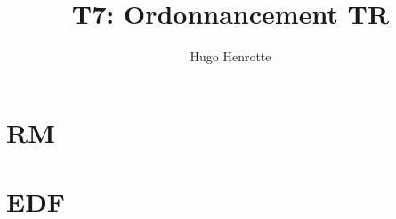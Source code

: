 \documentclass{article}
\author{Hugo Henrotte}
\title{T7: Ordonnancement TR}
\begin{document}
\maketitle

\section{RM}


\section{EDF}


\end{document}
